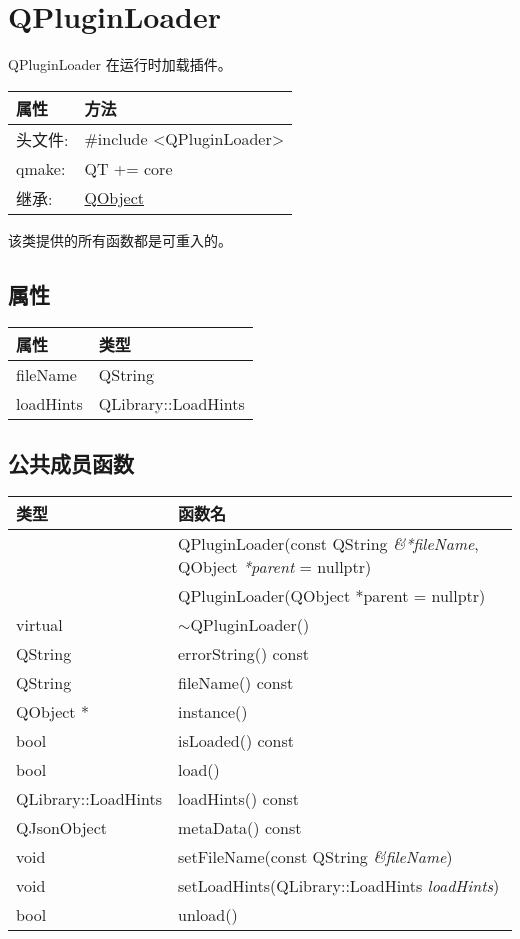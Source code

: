 \chapter{QPluginLoader}

QPluginLoader 在运行时加载插件。

\begin{tabular}{|l|l|}
\hline
属性 &	方法\\
\hline
头文件:& 	\#include <QPluginLoader>\\
\hline
qmake:& 	QT += core\\
\hline
继承:	&  \href{https://gitee.com/wcc210/QtDocumentCN/blob/master/Src/O/QObject/QObject.md}{QObject} \\
\hline
\end{tabular}

\begin{notice}
该类提供的所有函数都是可重入的。
\end{notice}


\section{属性}


\begin{tabular}{|l|l|}
\hline
属性 &	类型\\
\hline
fileName &	QString \\ 
\hline
loadHints	& QLibrary::LoadHints \\ 
\hline
\end{tabular}

\section{公共成员函数}

\begin{longtable}[l]{|l|m{25em}|}
\hline
 类型& 	函数名\\
\hline
& QPluginLoader(const QString \emph{\&*fileName}, QObject \emph{*parent} = nullptr) \\
\hline
&QPluginLoader(QObject *parent = nullptr) \\
\hline
virtual	&$\sim$QPluginLoader() \\
\hline
QString	&errorString() const \\
\hline
QString	&fileName() const \\
\hline
QObject *	&instance() \\
\hline
bool	&isLoaded() const \\
\hline
bool	&load() \\
\hline
QLibrary::LoadHints	&loadHints() const \\
\hline
QJsonObject	&metaData() const \\
\hline
void	&setFileName(const QString \emph{\&fileName}) \\
\hline
void&	setLoadHints(QLibrary::LoadHints \emph{loadHints}) \\
\hline
bool&	unload() \\
\hline
\end{longtable}

